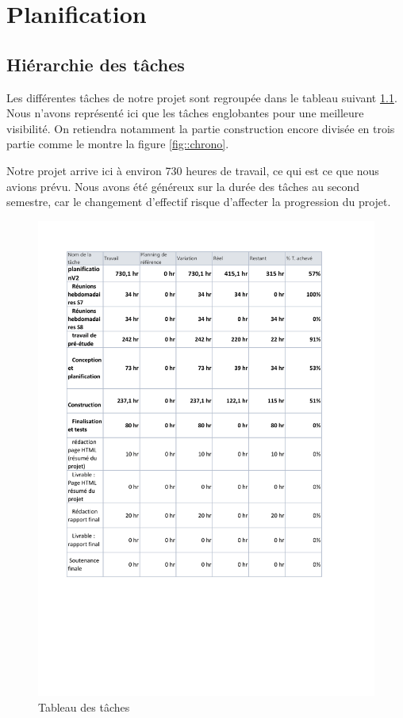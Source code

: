\chapter{Planification}

\section{Hiérarchie des tâches}
Les différentes tâches de notre projet sont regroupée dans le tableau suivant \ref{fig::taches}. Nous n'avons représenté ici que les tâches englobantes pour une meilleure visibilité. On retiendra notamment la partie construction encore divisée en trois partie comme le montre la figure \ref{fig::chrono}.

Notre projet arrive ici à environ 730 heures de travail, ce qui est ce que nous avions prévu. Nous avons été généreux sur la durée des tâches au second semestre, car le changement d'effectif risque d'affecter la progression du projet.

\begin{figure}[H]
	\centering
	\includegraphics[scale=0.5]{images/taches.pdf}
	\caption{Tableau des tâches}
	\label{fig::taches}
\end{figure}

